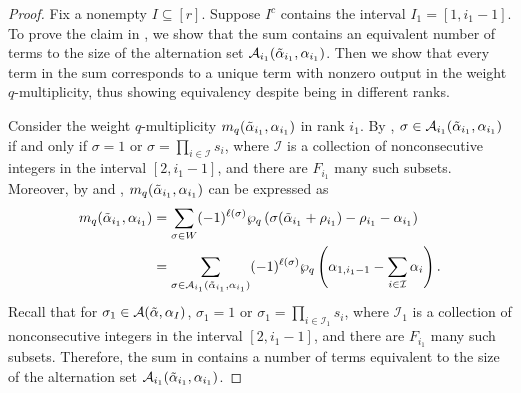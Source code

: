 \documentclass[10pt]{article}
\newcommand{\hr}[0]{\Tilde{\alpha}}
\newcommand{\newmu}[0]{\alpha_I}
\newcommand{\thealtset}[0]{\mathcal{A}(\hr,\newmu)}
\newcommand{\qpartition}[1]{\wp_q\left(#1\right)}
\begin{document}
\begin{proof}
    Fix a nonempty $I\subseteq [r]$. 
    Suppose $I^c$ contains the interval $I_1=[1,i_1-1]$.
    To prove the claim in , we show that the sum contains an equivalent number of terms to the size of the alternation set $\mathcal{A}_{i_1}(\hr_{i_1},\alpha_{i_1})$. Then we show that every term in the sum corresponds to a unique term with nonzero output in the weight $q$-multiplicity, thus showing equivalency despite being in different ranks.
    
    Consider the weight $q$-multiplicity $m_q(\hr_{i_1},\alpha_{i_1})$ in rank $i_1$. 
    By , $\sigma\in\mathcal{A}_{i_1}(\hr_{i_1},\alpha_{i_1})$ if and only if $\sigma=1$ or $\sigma=\prod_{i\in\mathcal{I}} s_i$, where $\mathcal{I}$ is a  collection of nonconsecutive integers in the interval $[2,i_1-1]$, and there are $F_{i_1}$ many such subsets. Moreover, by  and , $m_q(\hr_{i_1},\alpha_{i_1})$ can be expressed as
    \begin{align}
        m_q(\hr_{i_1},\alpha_{i_1}) &= \sum_{\sigma\in W} (-1)^{\ell(\sigma)}\qpartition{\sigma(\hr_{i_1}+\rho_{i_1})-\rho_{i_1}-\alpha_{i_1}} \notag\\
        &= \sum_{\sigma\in\mathcal{A}_{i_1}(\hr_{i_1},\alpha_{i_1})}(-1)^{\ell(\sigma)}\qpartition{\alpha_{1,i_1-1}-\sum_{i\in\mathcal{I}}\alpha_i}.\label{CASE 2 KIM RESULT IN THE RIGHT FORM}
    \end{align}
    Recall that for $\sigma_1\in\thealtset$, $\sigma_1=1$ or $\sigma_1=\prod_{i\in\mathcal{I}_1}s_i$, where $\mathcal{I}_1$ is a collection of nonconsecutive integers in the interval $[2,i_1-1]$, and there are $F_{i_1}$ many such subsets. Therefore, the sum in  
    contains a number of terms equivalent to the size of the alternation set $\mathcal{A}_{i_1}(\hr_{i_1},\alpha_{i_1})$.


\end{proof}
\end{document}
